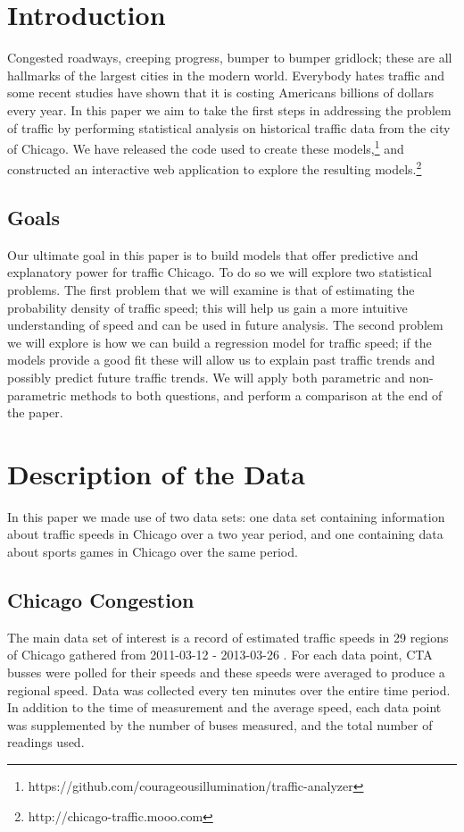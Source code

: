 \documentclass[12pt]{article}
\begin{document}
\maketitle
\section{Introduction}
Congested roadways, creeping progress, bumper to bumper gridlock; these are all hallmarks of the largest cities in the modern world. Everybody hates traffic and some recent studies have shown that it is costing Americans billions of dollars every year. In this paper we aim to take the first steps in addressing the problem of traffic by performing statistical analysis on historical traffic data from the city of Chicago. We have released the code used to create these models,\footnote{https://github.com/courageousillumination/traffic-analyzer} and constructed an interactive web application to explore the resulting models.\footnote{http://chicago-traffic.mooo.com}
\subsection{Goals}
Our ultimate goal in this paper is to build models that offer predictive and explanatory power for traffic Chicago. To do so we will explore two statistical problems. The first problem that we will examine is that of estimating the probability density of traffic speed; this will help us gain a more intuitive understanding of speed and can be used in future analysis. The second problem we will explore is how we can build a regression model for traffic speed; if the models provide a good fit these will allow us to explain past traffic trends and possibly predict future traffic trends. We will apply both parametric and non-parametric methods to both questions, and perform a comparison at the end of the paper.
\section{Description of the Data}
In this paper we made use of two data sets: one data set containing information about traffic speeds in Chicago over a two year period, and one containing data about sports games in Chicago over the same period.
\subsection{Chicago Congestion}
The main data set of interest is a record of estimated traffic speeds in 29 regions of Chicago gathered from 2011-03-12 - 2013-03-26 \cite{regiondataset}. For each data point, CTA busses were polled for their speeds and these speeds were averaged to produce a regional speed. Data was collected every ten minutes over the entire time period. In addition to the time of measurement and the average speed, each data point was supplemented by the number of buses measured, and the total number of readings used.
\end{document}
